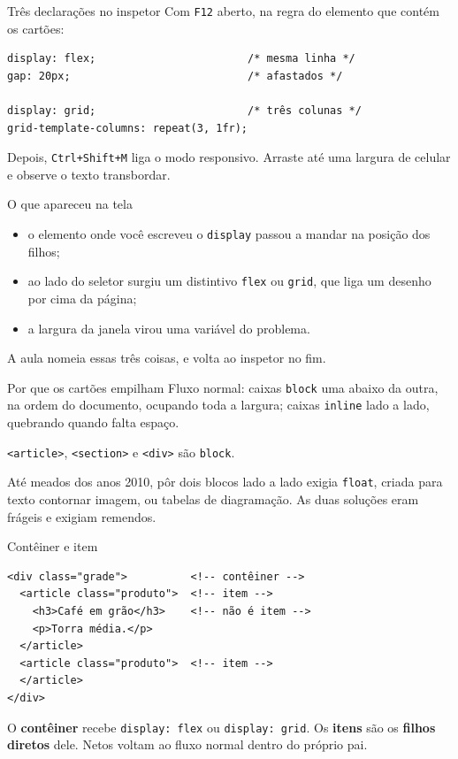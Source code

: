 \documentclass{beamer}
\begin{document}
\begin{frame}[fragile]{Três declarações no inspetor}
	Com \texttt{F12} aberto, na regra do elemento que contém os cartões:

	\begin{verbatim}
display: flex;                        /* mesma linha */
gap: 20px;                            /* afastados */

display: grid;                        /* três colunas */
grid-template-columns: repeat(3, 1fr);
  \end{verbatim}

	\vspace{0.2cm}
	Depois, \texttt{Ctrl+Shift+M} liga o modo responsivo. Arraste até uma largura
	de celular e observe o texto transbordar.
\end{frame}

\begin{frame}{O que apareceu na tela}
	\begin{itemize}
		\item o elemento onde você escreveu o \texttt{display} passou a mandar na
		      posição dos filhos;
		\item ao lado do seletor surgiu um distintivo \texttt{flex} ou
		      \texttt{grid}, que liga um desenho por cima da página;
		\item a largura da janela virou uma variável do problema.
	\end{itemize}

	\vspace{0.5cm}
	A aula nomeia essas três coisas, e volta ao inspetor no fim.
\end{frame}

\begin{frame}{Por que os cartões empilham}
	Fluxo normal: caixas \texttt{block} uma abaixo da outra, na ordem do
	documento, ocupando toda a largura; caixas \texttt{inline} lado a lado,
	quebrando quando falta espaço.

	\vspace{0.3cm}
	\texttt{<article>}, \texttt{<section>} e \texttt{<div>} são \texttt{block}.

	\vspace{0.5cm}
	Até meados dos anos 2010, pôr dois blocos lado a lado exigia \texttt{float},
	criada para texto contornar imagem, ou tabelas de diagramação. As duas
	soluções eram frágeis e exigiam remendos.
\end{frame}

\begin{frame}[fragile]{Contêiner e item}
	\begin{verbatim}
<div class="grade">          <!-- contêiner -->
  <article class="produto">  <!-- item -->
    <h3>Café em grão</h3>    <!-- não é item -->
    <p>Torra média.</p>
  </article>
  <article class="produto">  <!-- item -->
  </article>
</div>
  \end{verbatim}

	\vspace{0.2cm}
	O \textbf{contêiner} recebe \texttt{display: flex} ou \texttt{display: grid}.
	Os \textbf{itens} são os \textbf{filhos diretos} dele. Netos voltam ao fluxo
	normal dentro do próprio pai.
\end{frame}
\end{document}
